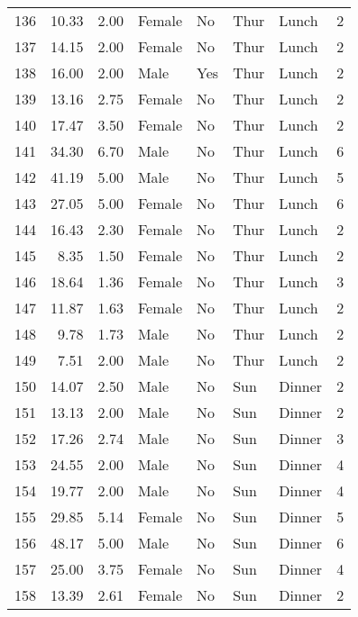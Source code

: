 \begin{tabular}{lrrllllr}
136 &       10.33 &   2.00 &  Female &     No &  Thur &   Lunch &     2 \\
137 &       14.15 &   2.00 &  Female &     No &  Thur &   Lunch &     2 \\
138 &       16.00 &   2.00 &    Male &    Yes &  Thur &   Lunch &     2 \\
139 &       13.16 &   2.75 &  Female &     No &  Thur &   Lunch &     2 \\
140 &       17.47 &   3.50 &  Female &     No &  Thur &   Lunch &     2 \\
141 &       34.30 &   6.70 &    Male &     No &  Thur &   Lunch &     6 \\
142 &       41.19 &   5.00 &    Male &     No &  Thur &   Lunch &     5 \\
143 &       27.05 &   5.00 &  Female &     No &  Thur &   Lunch &     6 \\
144 &       16.43 &   2.30 &  Female &     No &  Thur &   Lunch &     2 \\
145 &        8.35 &   1.50 &  Female &     No &  Thur &   Lunch &     2 \\
146 &       18.64 &   1.36 &  Female &     No &  Thur &   Lunch &     3 \\
147 &       11.87 &   1.63 &  Female &     No &  Thur &   Lunch &     2 \\
148 &        9.78 &   1.73 &    Male &     No &  Thur &   Lunch &     2 \\
149 &        7.51 &   2.00 &    Male &     No &  Thur &   Lunch &     2 \\
150 &       14.07 &   2.50 &    Male &     No &   Sun &  Dinner &     2 \\
151 &       13.13 &   2.00 &    Male &     No &   Sun &  Dinner &     2 \\
152 &       17.26 &   2.74 &    Male &     No &   Sun &  Dinner &     3 \\
153 &       24.55 &   2.00 &    Male &     No &   Sun &  Dinner &     4 \\
154 &       19.77 &   2.00 &    Male &     No &   Sun &  Dinner &     4 \\
155 &       29.85 &   5.14 &  Female &     No &   Sun &  Dinner &     5 \\
156 &       48.17 &   5.00 &    Male &     No &   Sun &  Dinner &     6 \\
157 &       25.00 &   3.75 &  Female &     No &   Sun &  Dinner &     4 \\
158 &       13.39 &   2.61 &  Female &     No &   Sun &  Dinner &     2 \\

\end{tabular}
